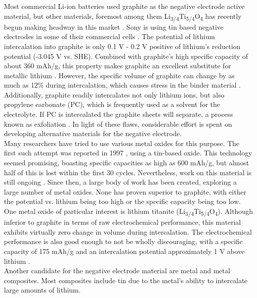 \documentclass[12pt]{article} %
\begin{document}
Most commercial Li-ion batteries used graphite as the negative electrode active material, but other materials, foremost among them Li\textsubscript{3/4}Ti\textsubscript{5/4}O\textsubscript{4} has recently begun making headway in this market \cite{kulova_new_2013}.
Sony is using tin based negative electrodes in some of their commercial cells \cite{reddy_thomas_section_2011-2}.
The potential of lithium intercalation into graphite is only 0.1 V - 0.2 V positive of lithium's reduction potential (-3.045 V vs. SHE).
Combined with graphite's high specific capacity of about 360 mAh/g, this property makes graphite an excellent substitute for metallic lithium \cite{reddy_thomas_figure_2011} \cite{reddy_thomas_figure_2011-1}.
However, the specific volume of graphite can change by as much as 12\% during intercalation, which causes stress in the binder material \cite{kulova_new_2013}.
Additionally, graphite readily intercalates not only lithium ions, but also propylene carbonate (PC), which is frequently used as a solvent for the electrolyte.
If PC is intercalated the graphite sheets will separate, a process known as exfoliation \cite{reddy_thomas_section_2011-2}.
In light of these flaws, considerable effort is spent on developing alternative materials for the negative electrode.
\\
Many researchers have tried to use various metal oxides for this purpose.
The first such attempt was reported in 1997 \cite{idota_tin-based_1997}, using a tin-based oxide.
This technology seemed promising, boasting specific capacities as high as 600 mAh/g, but almost half of this is lost within the first 30 cycles.
Nevertheless, work on this material is still ongoing \cite{kulova_new_2013}.
Since then, a large body of work has been created, exploring a large number of metal oxides.
None has proven superior to graphite, with either the potential vs. lithium being too high or the specific capacity being too low.
One metal oxide of particular interest is lithium titanite (Li\textsubscript{3/4}Ti\textsubscript{5/4}O\textsubscript{4}).
Although inferior to graphite in terms of raw electrochemical performance, this material exhibits virtually zero change in volume during intercalation.
The electrochemical performance is also good enough to not be wholly discouraging, with a specific capacity of 175 mAh/g and an intercalation potential approximately 1 V above lithium \cite{kulova_new_2013} \cite{reddy_thomas_figure_2011}.
\\
Another candidate for the negative electrode material are metal and metal composites.
Most composites include tin due to the metal's ability to intercalate large amounts of lithium.
\end{document}
